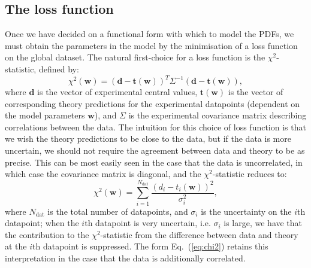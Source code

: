 \documentclass[withindex,glossary]{cam-thesis}
\renewcommand{\vec}[1]{\textbf{#1}} %
\begin{document}
\subsection{The loss function}
Once we have decided on a functional form with which to model the PDFs, we must obtain the parameters in the model by the minimisation of a loss function on the global dataset. The natural first-choice for a loss function is the $\chi^2$-statistic, defined by:
\begin{equation}
\label{eq:chi2}
\chi^2(\vec{w}) = (\vec{d} - \vec{t}(\vec{w}))^T \Sigma^{-1} (\vec{d} - \vec{t}(\vec{w})),
\end{equation}
where $\vec{d}$ is the vector of experimental central values, $\vec{t}(\vec{w})$ is the vector of corresponding theory predictions for the experimental datapoints (dependent on the model parameters $\vec{w}$), and $\Sigma$ is the experimental covariance matrix describing correlations between the data. The intuition for this choice of loss function is that we wish the theory predictions to be close to the data, but if the data is more uncertain, we should not require the agreement between data and theory to be as precise. This can be most easily seen in the case that the data is uncorrelated, in which case the covariance matrix is diagonal, and the $\chi^2$-statistic reduces to:
\begin{equation}
\label{eq:chi2_uncorrelated}
\chi^2(\vec{w}) = \sum_{i=1}^{N_{\text{dat}}} \frac{(d_i - t_i(\vec{w}))^2}{\sigma_i^2},
\end{equation}
where $N_{\text{dat}}$ is the total number of datapoints, and $\sigma_i$ is the uncertainty on the $i$th datapoint; when the $i$th datapoint is very uncertain, i.e. $\sigma_i$ is large, we have that the contribution to the $\chi^2$-statistic from the difference between data and theory at the $i$th datapoint is suppressed. The form Eq.~(\ref{eq:chi2}) retains this interpretation in the case that the data is additionally correlated.
\end{document}

